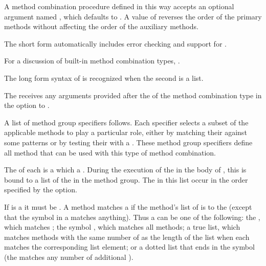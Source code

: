 A method combination procedure defined in this way accepts an optional
argument named , which defaults to 
.  A value of  reverses
the order of the primary methods without affecting the order of the
auxiliary methods.
 
The short form automatically includes error checking and support for
.
 
For a discussion of built-in method combination types, 
\seesection\BuiltInMethCombTypes.
 
 
The long form syntax of  is recognized 
when the second  is a list.  
 
The  
receives any arguments provided after the  of the method
combination type in the  option to
.
 
A list of method group specifiers follows.  Each specifier selects a subset
of the applicable methods to play a particular role, either by matching
their  against some patterns or by testing their  with
a .   
These method group specifiers define all method 
that can be used with this type of method combination.
 
 
The  of each  is a 
which  a .
During the execution of
the  in the body of , this
 is bound to a list of the  in the method group.  The
 in this list occur in the order specified by the 
 option.
 
If  is a  it must be \misc{*}.  
A method matches
a  if the method's 
list of  is 
to the  (except that the symbol \misc{*} in a 
 matches anything).  Thus 
a  can be one of the
following:
 the , which matches ;
 the symbol \misc{*}, which matches all methods;
 a true list, which matches methods with the same number of  
   as the length of the list when each  matches 
   the corresponding list element; or
 a dotted list that ends in the symbol \misc{*} 
   (the \misc{*} matches any number of additional ).
 
